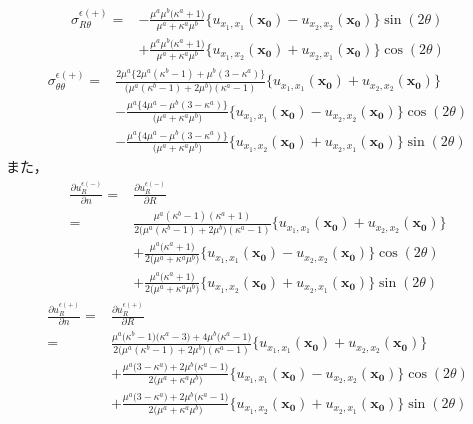 \begin{align}
	\sigma_{R\theta}^{\epsilon(+)}
	=&-\frac{\mu^{a}\mu^{b}\bigl(\kappa^{a}+1\bigr)}{\mu^{a}+\kappa^{a}\mu^{b}}
	\bigl\{u_{x_{1},x_{1}}(\bm{x_{0}})-u_{x_{2},x_{2}}(\bm{x_{0}})\bigr\}\sin(2\theta)
	\nonumber
	\\
	&+\frac{\mu^{a}\mu^{b}\bigl(\kappa^{a}+1\bigr)}{\mu^{a}+\kappa^{a}\mu^{b}}
	\bigl\{u_{x_{1},x_{2}}(\bm{x_{0}})+u_{x_{2},x_{1}}(\bm{x_{0}})\bigr\}\cos(2\theta)
	\label{eq:eRThOutEpsSol}
\end{align}
\begin{align}
	\sigma_{\theta\theta}^{\epsilon(+)}
	=&\frac{2\mu^{a}\bigl\{2\mu^{a}(\kappa^{b}-1)+\mu^{b}(3-\kappa^{a})\bigr\}}
	{\bigl(\mu^{a}(\kappa^{b}-1)+2\mu^{b}\bigr)(\kappa^{a}-1)}
	\bigl\{u_{x_{1},x_{1}}(\bm{x_{0}})+u_{x_{2},x_{2}}(\bm{x_{0}})\bigr\}
	\nonumber
	\\
	&-\frac{\mu^{a}\bigl\{4\mu^{a}-\mu^{b}(3-\kappa^{a})\bigr\}}
	{\bigl(\mu^{a}+\kappa^{a}\mu^{b}\bigr)}
	\bigl\{u_{x_{1},x_{1}}(\bm{x_{0}})-u_{x_{2},x_{2}}(\bm{x_{0}})\bigr\}\cos(2\theta)
	\nonumber
	\\
	&-\frac{\mu^{a}\bigl\{4\mu^{a}-\mu^{b}(3-\kappa^{a})\bigr\}}
	{\bigl(\mu^{a}+\kappa^{a}\mu^{b}\bigr)}
	\bigl\{u_{x_{1},x_{2}}(\bm{x_{0}})+u_{x_{2},x_{1}}(\bm{x_{0}})\bigr\}\sin(2\theta)
	\label{eq:eThThOutEpsSol}
\end{align}
また，
\begin{align}
	\frac{\partial u_{R}^{\epsilon(-)}}{\partial n}
	=&\frac{\partial u_{R}^{\epsilon(-)}}{\partial R}
	\nonumber
	\\
	=&\frac{\mu^{a}(\kappa^{b}-1)(\kappa^{a}+1)}{2\bigl(\mu^{a}(\kappa^{b}-1)+2\mu^{b}\bigr)(\kappa^{a}-1)}
	\bigl\{u_{x_{1},x_{1}}(\bm{x_{0}})+u_{x_{2},x_{2}}(\bm{x_{0}})\bigr\}
	\nonumber
	\\
	&+\frac{\mu^{a}\bigl(\kappa^{a}+1\bigr)}{2\bigl(\mu^{a}+\kappa^{a}\mu^{b}\bigr)}
	\bigl\{u_{x_{1},x_{1}}(\bm{x_{0}})-u_{x_{2},x_{2}}(\bm{x_{0}})\bigr\}\cos(2\theta)
	\nonumber
	\\
	&+\frac{\mu^{a}\bigl(\kappa^{a}+1\bigr)}{2\bigl(\mu^{a}+\kappa^{a}\mu^{b}\bigr)}
	\bigl\{u_{x_{1},x_{2}}(\bm{x_{0}})+u_{x_{2},x_{1}}(\bm{x_{0}})\bigr\}\sin(2\theta)
	\label{eq:eRRInEpsSol}
\end{align}
\begin{align}
	\frac{\partial u_{R}^{\epsilon(+)}}{\partial n}
	=&\frac{\partial u_{R}^{\epsilon(+)}}{\partial R}
	\nonumber
	\\
	=&\frac{ \mu^{a}\bigl(\kappa^{b}-1\bigr)\bigl(\kappa^{a}-3\bigr)+4\mu^{b}\bigl(\kappa^{a}-1\bigr)　}
		{2\bigl(\mu^{a}(\kappa^{b}-1)+2\mu^{b}\bigr)(\kappa^{a}-1)}
	\bigl\{u_{x_{1},x_{1}}(\bm{x_{0}})+u_{x_{2},x_{2}}(\bm{x_{0}})\bigr\}
	\nonumber
	\\
	&+\frac{\mu^{a}\bigl(3-\kappa^{a}\bigr)+2\mu^{b}\bigl(\kappa^{a}-1\bigr)}{2\bigl(\mu^{a}+\kappa^{a}\mu^{b}\bigr)}
	\bigl\{u_{x_{1},x_{1}}(\bm{x_{0}})-u_{x_{2},x_{2}}(\bm{x_{0}})\bigr\}\cos(2\theta)
	\nonumber
	\\
	&+\frac{\mu^{a}\bigl(3-\kappa^{a}\bigr)+2\mu^{b}\bigl(\kappa^{a}-1\bigr)}{2\bigl(\mu^{a}+\kappa^{a}\mu^{b}\bigr)}
	\bigl\{u_{x_{1},x_{2}}(\bm{x_{0}})+u_{x_{2},x_{1}}(\bm{x_{0}})\bigr\}\sin(2\theta)
	\label{eq:eRROutEpsSol}
\end{align}
